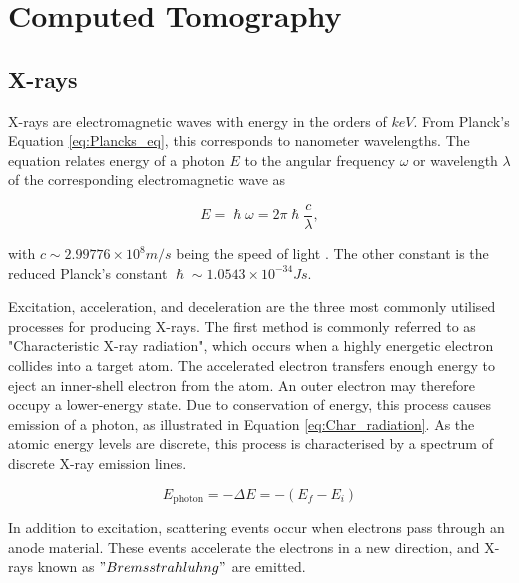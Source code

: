 
\chapter{Computed Tomography}

\section{X-rays}\label{sec:CT_Xrays}
X-rays are electromagnetic waves with energy in the orders of $keV$.
From Planck's Equation \eqref{eq:Plancks_eq}, this corresponds to nanometer wavelengths.
The equation relates energy of a photon $E$ to the angular frequency $\omega$ or wavelength $\lambda$ of the corresponding electromagnetic wave as

\begin{equation}\label{eq:Plancks_eq}
    E = \hslash \omega = 2\pi \hslash \frac{c}{\lambda},
\end{equation}

with $c \sim 2.99776 \times 10^8 m/s$ being the speed of light \cite{blokhin1961physics}.
The other constant is the reduced Planck's constant $\hslash \sim 1.0543 \times 10^{-34} Js$.

Excitation, acceleration, and deceleration are the three most commonly utilised processes for producing X-rays.
The first method is commonly referred to as "Characteristic X-ray radiation", which occurs when a highly energetic electron collides into a target atom.
The accelerated electron transfers enough energy to eject an inner-shell electron from the atom.
An outer electron may therefore occupy a lower-energy state.
Due to conservation of energy, this process causes emission of a photon, as illustrated in Equation \eqref{eq:Char_radiation}.
As the atomic energy levels are discrete, this process is characterised by a spectrum of discrete X-ray emission lines.

\begin{equation}\label{eq:Char_radiation}
    E_{\mathrm{photon}} = - \Delta E = - (E_f - E_i)
\end{equation}

In addition to excitation, scattering events occur when electrons pass through an anode material.
These events accelerate the electrons in a new direction, and X-rays known as $"Bremsstrahluhng"$ are emitted. %

